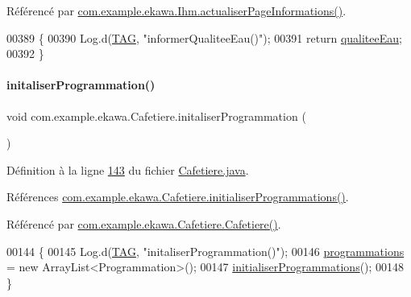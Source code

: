 Référencé par \hyperlink{_ihm_8java_source_l00919}{com.\+example.\+ekawa.\+Ihm.\+actualiser\+Page\+Informations()}.


\begin{DoxyCode}
00389     \{
00390         Log.d(\hyperlink{classcom_1_1example_1_1ekawa_1_1_cafetiere_aa0c1fd99a2508b06c462aea17034aa91}{TAG}, \textcolor{stringliteral}{"informerQualiteeEau()"});
00391         \textcolor{keywordflow}{return} \hyperlink{classcom_1_1example_1_1ekawa_1_1_cafetiere_a27aba2ce49934d0bf7b2d2230b3003d7}{qualiteeEau};
00392     \}
\end{DoxyCode}
\mbox{\label{classcom_1_1example_1_1ekawa_1_1_cafetiere_aae065b86cdb3a8df2c904068aab7e9bf}} 
\paragraph{\texorpdfstring{initaliser\+Programmation()}{initaliserProgrammation()}}
{\footnotesize\ttfamily void com.\+example.\+ekawa.\+Cafetiere.\+initaliser\+Programmation (\begin{DoxyParamCaption}{ }\end{DoxyParamCaption})\hspace{0.3cm}{\ttfamily [private]}}



Définition à la ligne \hyperlink{_cafetiere_8java_source_l00143}{143} du fichier \hyperlink{_cafetiere_8java_source}{Cafetiere.\+java}.



Références \hyperlink{_cafetiere_8java_source_l00692}{com.\+example.\+ekawa.\+Cafetiere.\+initialiser\+Programmations()}.



Référencé par \hyperlink{_cafetiere_8java_source_l00108}{com.\+example.\+ekawa.\+Cafetiere.\+Cafetiere()}.


\begin{DoxyCode}
00144     \{
00145         Log.d(\hyperlink{classcom_1_1example_1_1ekawa_1_1_cafetiere_aa0c1fd99a2508b06c462aea17034aa91}{TAG}, \textcolor{stringliteral}{"initaliserProgrammation()"});
00146         \hyperlink{classcom_1_1example_1_1ekawa_1_1_cafetiere_a987c8e1bcea506b65f4b05f955b3f699}{programmations} = \textcolor{keyword}{new} ArrayList<Programmation>();
00147         \hyperlink{classcom_1_1example_1_1ekawa_1_1_cafetiere_a406e5771edb1663ebb1fc571365b75ac}{initialiserProgrammations}();
00148     \}
\end{DoxyCode}
\mbox{\label{classcom_1_1example_1_1ekawa_1_1_cafetiere_ae9092a9540897e60c4cf7307073a75ab}} 
